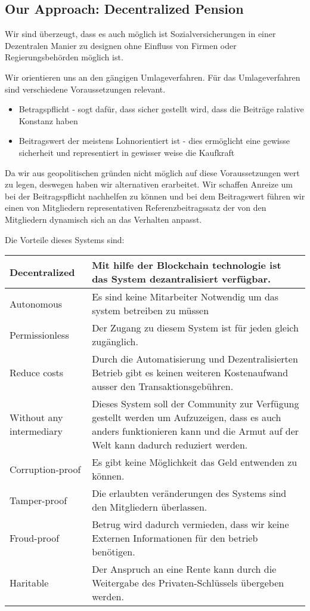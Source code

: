 \subsection{Our Approach: Decentralized Pension}

Wir sind überzeugt, dass es auch möglich ist Sozialversicherungen in einer Dezentralen Manier zu designen ohne Einfluss von Firmen oder Regierungsbehörden möglich ist.

Wir orientieren uns an den gängigen Umlageverfahren. Für das Umlageverfahren sind verschiedene Voraussetzungen relevant. 

\begin{itemize}
\item Betragspflicht - sogt dafür, dass sicher gestellt wird, dass die Beiträge ralative Konstanz haben
\item Beitragswert der meistens Lohnorientiert ist - dies ermöglicht eine gewisse sicherheit und representiert in gewisser weise die Kaufkraft
\end{itemize}

Da wir aus geopolitischen gründen nicht möglich auf diese Voraussetzungen wert zu legen, deswegen haben wir alternativen erarbeitet.
Wir schaffen Anreize um bei der Beitragspflicht nachhelfen zu können und bei dem Beitragswert führen wir einen von Mitgliedern representativen Referenzbeitragssatz der von den Mitgliedern dynamisch sich an das Verhalten anpasst.

Die Vorteile dieses Systems sind:
\begin{table}[]
\begin{tabular}{p{5cm}|p{8cm}}
Decentralized & Mit hilfe der Blockchain technologie ist das System dezantralisiert verfügbar.  \\ \hline
Autonomous & Es sind keine Mitarbeiter Notwendig um das system betreiben zu müssen   \\ \hline
Permissionless & Der Zugang zu diesem System ist für jeden gleich zugänglich. \\ \hline
Reduce costs & Durch die Automatisierung und Dezentralisierten Betrieb gibt es keinen weiteren Kostenaufwand ausser den Transaktionsgebühren. \\ \hline
Without any intermediary & Dieses System soll der Community zur Verfügung gestellt werden um Aufzuzeigen, dass es auch anders funktionieren kann und die Armut auf der Welt kann dadurch reduziert werden. \\ \hline
Corruption-proof & Es gibt keine Möglichkeit das Geld entwenden zu können. \\ \hline
Tamper-proof & Die erlaubten veränderungen des Systems sind den Mitgliedern überlassen. \\ \hline
Froud-proof & Betrug wird dadurch vermieden, dass wir keine Externen Informationen für den betrieb benötigen. \\ \hline
Haritable & Der Anspruch an eine Rente kann durch die Weitergabe des Privaten-Schlüssels übergeben werden.
\end{tabular}
\end{table}



